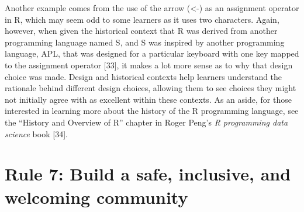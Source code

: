 \documentclass[
  10pt,
  letterpaper,
]{article}
\begin{document}
Another example comes from the use of the arrow (\textless-) as an
assignment operator in R, which may seem odd to some learners as it uses
two characters. Again, however, when given the historical context that R
was derived from another programming language named S, and S was
inspired by another programming language, APL, that was designed for a
particular keyboard with one key mapped to the assignment operator
{[}33{]}, it makes a lot more sense as to why that design choice was
made. Design and historical contexts help learners understand the
rationale behind different design choices, allowing them to see choices
they might not initially agree with as excellent within these contexts.
As an aside, for those interested in learning more about the history of
the R programming language, see the ``History and Overview of R''
chapter in Roger Peng's \emph{R programming data science} book {[}34{]}.

\section{Rule 7: Build a safe, inclusive, and welcoming
community}\label{sec-rule7}
\end{document}
